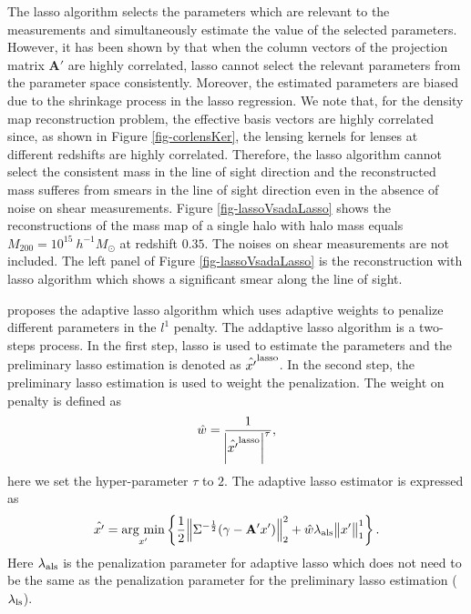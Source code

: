 \documentclass[twocolumn]{aastex62}
\newcommand{\argmin}{\mathop{\rm arg~min}\limits}
\begin{document}
The lasso algorithm selects the parameters which are relevant to the measurements and simultaneously estimate the value of
the selected parameters. However, it has been shown by
\citet{AdaLASSO-Zou2006} that when the column vectors of the projection matrix $\mathbf{A'}$ are highly correlated,
lasso cannot select the relevant parameters from the parameter space consistently. Moreover, the estimated parameters
are biased due to the shrinkage process in the lasso regression. We note that, for the density map reconstruction problem,
the effective basis vectors are highly correlated since, as shown in Figure \ref{fig-corlensKer}, the lensing kernels for
lenses at different redshifts are highly correlated. Therefore, the lasso algorithm cannot select the consistent mass in
the line of sight direction and the reconstructed mass sufferes from smears in the line of sight direction even in the
absence of noise on shear measurements.
Figure \ref{fig-lassoVsadaLasso} shows the reconstructions of the mass map of a single halo with halo mass equals
$M_{200}=10^{15} ~h^{-1}M_{\odot}$ at redshift $0.35$. The noises on shear measurements are not included. The left panel of
Figure \ref{fig-lassoVsadaLasso} is the reconstruction with lasso algorithm which shows a significant smear along the line of sight.

\citet{AdaLASSO-Zou2006} proposes the adaptive lasso algorithm which uses adaptive weights to penalize different parameters
in the $l^1$ penalty. The addaptive lasso algorithm is a two-steps process. In the first step, lasso is used to estimate the
parameters and the preliminary lasso estimation is denoted as $\hat{x'}^{\rm{lasso}}$. In the second step, the preliminary
lasso estimation is used to weight the penalization. The weight on penalty is defined as
\begin{equation}
\hat{w}= \frac{1}{\abs{\hat{x'}^{\rm{lasso}}}^\tau},
\end{equation}
here we set the hyper-parameter $\tau$ to $2$.
The adaptive lasso estimator is expressed as
\begin{equation}\label{eq-lossFun}
\hat{x'}=\argmin_{x'} \left\{ \frac{1}{2} \norm{\Sigma^{-\frac{1}{2}}(\gamma-\mathbf{A'}x')}^2_2 +
\hat{w}\lambda_{\rm{als}} \norm{x'}^1_1\right\}.
\end{equation}
Here $\lambda_{\rm{als}}$ is the penalization parameter for adaptive lasso which does not need to be the same as the
penalization parameter for the preliminary lasso estimation ($\lambda_{\rm{ls}}$).
\end{document}
